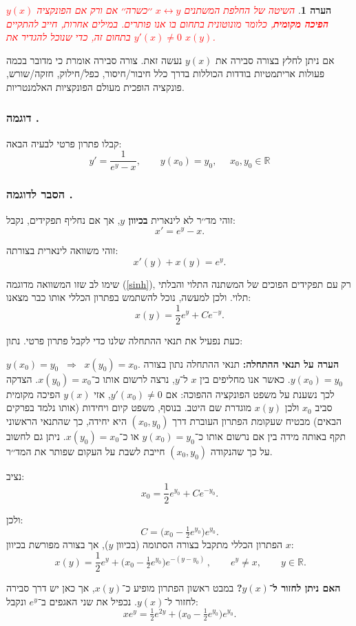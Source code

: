 \documentclass{article}
\numberwithin{equation}{section}
\newcounter{example}[section]
\renewcommand{\theexample}{\thesection.\arabic{example}}
\newcommand{\example}[1][]{%
  \refstepcounter{example}%
  \subsubsection*{דוגמה \theexample\; #1}%
  \label{exm:\theexample}%
}
\newcommand{\explanation}{%
  \subsubsection*{הסבר לדוגמה \theexample}%
}
\newtheorem{remark}{הערה}[section]
\begin{document}
\begin{remark}
\textcolor{red}{השיטה של החלפת המשתנים $x \leftrightarrow y$ ׳׳כשרה׳׳ אם ורק אם הפונקציה $y(x)$ 
\textbf{הפיכה מקומית}, כלומר מונוטונית בתחום בו אנו פותרים. במילים אחרות, חייב להתקיים $y'(x) \neq 0$ בתחום זה, כדי שנוכל להגדיר את $x(y)$.}
\end{remark}

\begin{ruleofthumb}
אם ניתן לחלץ בצורה סבירה את $y(x)$ נעשה זאת. 
צורה סבירה אומרת כי מדובר בכמה פעולות אריתמטיות בודדות הכוללות בדרך כלל 
חיבור/חיסור, כפל/חילוק, חזקה/שורש, פונקציה הופכית מעולם הפונקציות האלמנטריות.
\end{ruleofthumb}



\example{}
קבלו פתרון פרטי לבעיה הבאה:
\[
y' = \frac{1}{e^y - x}, \qquad y(x_0) = y_0,\,\,\,\,\,\,\,\, x_{0},y_{0}\in\mathbb{R}
\]
\explanation
זוהי מד׳׳ר לא לינארית \textbf{בכיוון $y$}, אך אם נחליף תפקידים, נקבל:
\[
x' = e^y - x.
\]

זוהי משוואה לינארית בצורתה:
\[
x'(y) + x(y) = e^y.
\]

שימו לב שזו המשוואה מדוגמה  (\ref{sinh}), רק עם תפקידים הפוכים של המשתנה התלוי והבלתי תלוי. 
ולכן למעשה, נוכל להשתמש בפתרון הכללי אותו כבר מצאנו:
\[
x(y) = \frac{1}{2} e^y + C e^{-y}.
\]

כעת נפעיל את תנאי ההתחלה שלנו כדי לקבל פתרון פרטי.
נתון: 

$y(x_0)=y_0 \;\;\Rightarrow\;\; x(y_0)=x_0$. \textbf{הערה על תנאי ההתחלה:} 
תנאי ההתחלה נתון בצורה $y(x_0)=y_0$. 
כאשר אנו מחליפים בין $x$ ל־$y$, נרצה לרשום אותו כ־$x(y_0)=x_0$. 
הצדקה לכך נשענת על משפט הפונקציה ההפוכה: 
אם $y'(x_0)\neq 0$, אזי $y(x)$ הפיכה מקומית סביב $x_0$ 
ולכן $x(y)$ מוגדרת שם היטב. 
בנוסף, משפט קיום ויחידות (אותו נלמד בפרקים הבאים) מבטיח שעקומת הפתרון העוברת דרך 
$(x_0,y_0)$ היא יחידה, כך שהתנאי הראשוני תקף באותה מידה בין אם 
נרשום אותו כ־$y(x_0)=y_0$ או כ־$x(y_0)=x_0$. ניתן גם לחשוב על כך שהנקודה $(x_{0},y_{0})$ חייבת לשבת על העקום שפותר את המד׳׳ר.


נציב:
\[
x_0 = \frac{1}{2} e^{y_0} + C e^{-y_0}.
\]

ולכן:
\[
C = \Big(x_0 - \tfrac{1}{2} e^{y_0}\Big)e^{y_0}.
\]
הפתרון הכללי מתקבל בצורה הסתומה (בכיוון $y$), אך בצורה מפורשת בכיוון $x$:
\[
\boxed{\, x(y) = \frac{1}{2} e^y + \Big(x_0 - \tfrac{1}{2} e^{y_0}\Big) e^{-(y-y_0)} \,, \qquad e^y\neq x, \qquad y\in\mathbb{R}}.
\]

\textbf{האם ניתן לחזור ל־$y(x)$?}  
במבט ראשון הפתרון מופיע כ־$x(y)$, אך כאן יש דרך סבירה לחזור ל־$y(x)$.  
נכפיל את שני האגפים ב־$e^y$ ונקבל:
\[
x e^y = \tfrac{1}{2} e^{2y} + \Big(x_0 - \tfrac{1}{2} e^{y_0}\Big) e^{y_0}.
\]
\end{document}
